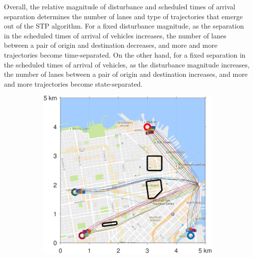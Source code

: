 Overall, the relative magnitude of disturbance and scheduled times of arrival separation determines the number of lanes and type of trajectories that emerge out of the STP algorithm. For a fixed disturbance magnitude, as the separation in the scheduled times of arrival of vehicles increases, the number of lanes between a pair of origin and destination decreases, and more and more trajectories become time-separated. On the other hand, for a fixed separation in the scheduled times of arrival of vehicles, as the disturbance magnitude increases, the number of lanes between a pair of origin and destination increases, and more and more trajectories become state-separated.
%
\begin{figure}[!htb]
 \centering
\begin{subfigure}{0.5\textwidth}
  \includegraphics[width=\columnwidth]{figs/sf_d6sep0}
  \label{fig:sf_d6sep0}
\end{subfigure}%
\begin{subfigure}{0.5\textwidth}

\end{subfigure}
\end{figure}
